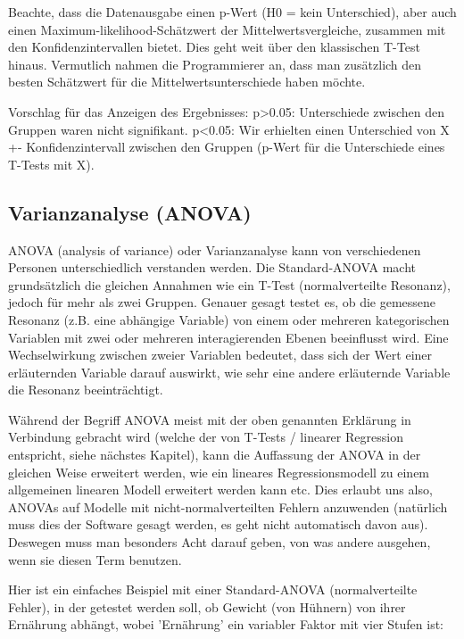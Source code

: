 \documentclass[a4paper,twoside]{tufte-book}\usepackage[]{graphicx}\usepackage[]{color}
\begin{document}
Beachte, dass die Datenausgabe einen p-Wert (H0 = kein Unterschied), aber auch einen Maximum-likelihood-Schätzwert der Mittelwertsvergleiche, zusammen mit den Konfidenzintervallen bietet. Dies geht weit über den klassischen T-Test hinaus. Vermutlich nahmen die Programmierer an, dass man zusätzlich den besten Schätzwert für die Mittelwertsunterschiede haben möchte.

Vorschlag für das Anzeigen des Ergebnisses: p>0.05: Unterschiede zwischen den Gruppen waren nicht signifikant. p<0.05: Wir erhielten einen Unterschied von X +- Konfidenzintervall zwischen den Gruppen (p-Wert für die Unterschiede eines T-Tests mit X). 

\subsection{Varianzanalyse (ANOVA)}

ANOVA (analysis of variance) oder Varianzanalyse kann von verschiedenen Personen unterschiedlich verstanden werden. Die Standard-ANOVA macht grundsätzlich die gleichen Annahmen wie ein T-Test (normalverteilte Resonanz), jedoch für mehr als zwei Gruppen. Genauer gesagt testet es, ob die gemessene Resonanz (z.B. eine abhängige Variable) von einem oder mehreren kategorischen Variablen mit zwei oder mehreren interagierenden Ebenen beeinflusst wird. Eine Wechselwirkung zwischen zweier Variablen bedeutet, dass sich der Wert einer erläuternden Variable darauf auswirkt, wie sehr eine andere erläuternde Variable die Resonanz beeinträchtigt.

Während der Begriff ANOVA meist mit der oben genannten Erklärung in Verbindung gebracht wird (welche der von T-Tests / linearer Regression entspricht, siehe nächstes Kapitel), kann die Auffassung der ANOVA in der gleichen Weise erweitert werden, wie ein lineares Regressionsmodell zu einem allgemeinen linearen Modell erweitert werden kann etc. Dies erlaubt uns also, ANOVAs auf Modelle mit nicht-normalverteilten Fehlern anzuwenden (natürlich muss dies der Software gesagt werden, es geht nicht automatisch davon aus). Deswegen muss man besonders Acht darauf geben, von was andere ausgehen, wenn sie diesen Term benutzen.

Hier ist ein einfaches Beispiel mit einer Standard-ANOVA (normalverteilte Fehler), in der getestet werden soll, ob Gewicht (von Hühnern) von ihrer Ernährung abhängt, wobei 'Ernährung' ein variabler Faktor mit vier Stufen ist:
\end{document}
